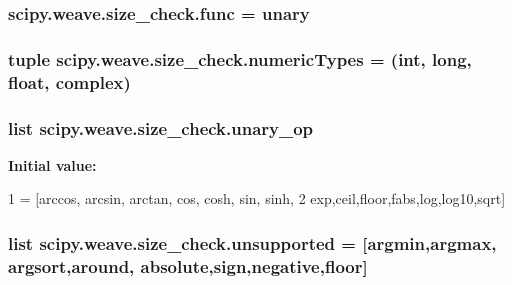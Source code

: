 \subsubsection[{func}]{\setlength{\rightskip}{0pt plus 5cm}scipy.\+weave.\+size\+\_\+check.\+func = {\bf unary}}\label{namespacescipy_1_1weave_1_1size__check_af323a829812cb3ef0439906e83963b4a}
\hypertarget{namespacescipy_1_1weave_1_1size__check_aafd0efd65b5562281b2883d56502f24e}{}
\subsubsection[{numeric\+Types}]{\setlength{\rightskip}{0pt plus 5cm}tuple scipy.\+weave.\+size\+\_\+check.\+numeric\+Types = (int, long, float, {\bf complex})}\label{namespacescipy_1_1weave_1_1size__check_aafd0efd65b5562281b2883d56502f24e}
\hypertarget{namespacescipy_1_1weave_1_1size__check_a6de03fe0b28c5abc0bd80e412f7f8bc3}{}
\subsubsection[{unary\+\_\+op}]{\setlength{\rightskip}{0pt plus 5cm}list scipy.\+weave.\+size\+\_\+check.\+unary\+\_\+op}\label{namespacescipy_1_1weave_1_1size__check_a6de03fe0b28c5abc0bd80e412f7f8bc3}
{\bfseries Initial value\+:}
\begin{DoxyCode}
1 = [arccos, arcsin, arctan, cos, cosh, sin, sinh,
2             exp,ceil,floor,fabs,log,log10,sqrt]
\end{DoxyCode}
\hypertarget{namespacescipy_1_1weave_1_1size__check_a3ca3f23b5af8a7228e333e5e439221e5}{}
\subsubsection[{unsupported}]{\setlength{\rightskip}{0pt plus 5cm}list scipy.\+weave.\+size\+\_\+check.\+unsupported = \mbox{[}argmin,argmax, argsort,around, absolute,sign,negative,{\bf floor}\mbox{]}}\label{namespacescipy_1_1weave_1_1size__check_a3ca3f23b5af8a7228e333e5e439221e5}
